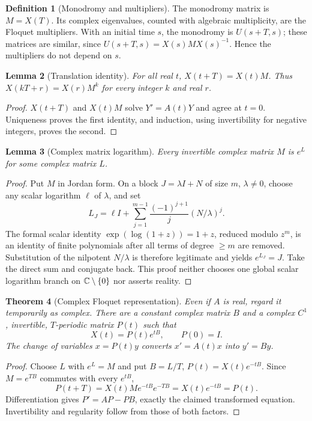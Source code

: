 \documentclass[11pt,oneside]{book}
\newtheorem{theorem}{Theorem}[chapter]
\newtheorem{lemma}[theorem]{Lemma}
\theoremstyle{definition}
\newtheorem{definition}[theorem]{Definition}
\theoremstyle{remark}\newtheorem{remark}[theorem]{Remark}
\begin{document}
\begin{definition}[Monodromy and multipliers]\label{d13:08:monodromy}
The monodromy matrix is \(M=X(T)\). Its complex eigenvalues, counted with
algebraic multiplicity, are the Floquet multipliers. With an initial time
\(s\), the monodromy is \(U(s+T,s)\); these matrices are similar, since
\(U(s+T,s)=X(s)MX(s)^{-1}\). Hence the multipliers do not depend on \(s\).
\end{definition}

\begin{lemma}[Translation identity]\label{d13:08:translation}
For all real \(t\), \(X(t+T)=X(t)M\). Thus
\(X(kT+r)=X(r)M^k\) for every integer \(k\) and real \(r\).
\end{lemma}
\begin{proof}
\(X(t+T)\) and \(X(t)M\) solve \(Y'=A(t)Y\) and agree at \(t=0\).
Uniqueness proves the first identity, and induction, using invertibility
for negative integers, proves the second.
\end{proof}

\begin{lemma}[Complex matrix logarithm]\label{d13:08:matrix-log}
Every invertible complex matrix \(M\) is \(e^L\) for some complex matrix \(L\).
\end{lemma}
\begin{proof}
Put \(M\) in Jordan form. On a block \(J=\lambda I+N\) of size \(m\),
\(\lambda\ne0\), choose any scalar logarithm \(\ell\) of \(\lambda\), and set
\[
 L_J=\ell I+\sum_{j=1}^{m-1}\frac{(-1)^{j+1}}{j}(N/\lambda)^j .
\]
The formal scalar identity \(\exp(\log(1+z))=1+z\), reduced modulo
\(z^m\), is an identity of finite polynomials after all terms of degree
\(\ge m\) are removed. Substitution of the nilpotent \(N/\lambda\)
is therefore legitimate and yields \(e^{L_J}=J\).
Take the direct sum and conjugate back. This proof neither chooses one
global scalar logarithm branch on \(\mathbb C\setminus\{0\}\) nor asserts reality.
\end{proof}

\begin{theorem}[Complex Floquet representation]\label{d13:08:floquet}
Even if \(A\) is real, regard it temporarily as complex. There are a constant
complex matrix \(B\) and a complex \(C^1\), invertible, \(T\)-periodic matrix
\(P(t)\) such that
\[
 X(t)=P(t)e^{tB},\qquad P(0)=I .
\]
The change of variables \(x=P(t)y\) converts \(x'=A(t)x\) into \(y'=By\).
\end{theorem}
\begin{proof}
Choose \(L\) with \(e^L=M\) and put \(B=L/T\),
\(P(t)=X(t)e^{-tB}\). Since \(M=e^{TB}\) commutes with every \(e^{tB}\),
\[
 P(t+T)=X(t)M e^{-tB}e^{-TB}=X(t)e^{-tB}=P(t).
\]
Differentiation gives \(P'=AP-PB\), exactly the claimed transformed
equation. Invertibility and regularity follow from those of both factors.
\end{proof}
\end{document}
